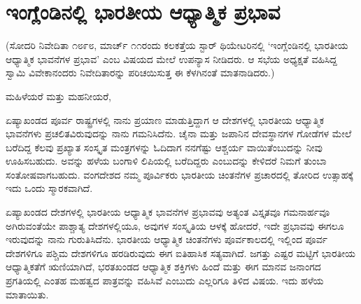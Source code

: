 
\chapter{ಇಂಗ್ಲೆಂಡಿನಲ್ಲಿ ಭಾರತೀಯ ಆಧ್ಯಾತ್ಮಿಕ ಪ್ರಭಾವ}

(ಸೋದರಿ ನಿವೇದಿತಾ ೧೮೯೮, ಮಾರ್ಚ್​ ೧೧ರಂದು ಕಲಕತ್ತೆಯ ಸ್ಟಾರ್​ ಥಿಯೇಟರಿನಲ್ಲಿ ‘ಇಂಗ್ಲೆಂಡಿನಲ್ಲಿ ಭಾರತೀಯ ಆಧ್ಯಾತ್ಮಿಕ ಭಾವನೆಗಳ ಪ್ರಭಾವ’ ಎಂಬ ವಿಷಯದ ಮೇಲೆ ಉಪನ್ಯಾಸ ನೀಡಿದರು. ಆ ಸಭೆಯ ಅಧ್ಯಕ್ಷತೆ ವಹಿಸಿದ್ದ ಸ್ವಾಮಿ ವಿವೇಕಾನಂದರು ನಿವೇದಿತಾರನ್ನು ಪರಿಚಯಿಸುತ್ತ ಈ ಕೆಳಗಿನಂತೆ ಮಾತನಾಡಿದರು.)

ಮಹಿಳೆಯರೆ ಮತ್ತು ಮಹನೀಯರೆ, 

ಏಷ್ಯಾಖಂಡದ ಪೂರ್ವ ರಾಷ್ಟ್ರಗಳಲ್ಲಿ ನಾನು ಪ್ರಯಾಣ ಮಾಡುತ್ತಿದ್ದಾಗ ಆ ದೇಶಗಳಲ್ಲಿ ಭಾರತೀಯ ಆಧ್ಯಾತ್ಮಿಕ ಭಾವನೆಗಳು ಪ್ರಚಲಿತವಿರುವುದನ್ನು ನಾನು ಗಮನಿಸಿದೆನು. ಚೈನಾ ಮತ್ತು ಜಪಾನಿನ ದೇವಸ್ಥಾನಗಳ ಗೋಡೆಗಳ ಮೇಲೆ ಬರೆದಿದ್ದ ಕೆಲವು ಪ್ರಖ್ಯಾತ ಸಂಸ್ಕೃತ ಮಂತ್ರಗಳನ್ನು ಓದಿದಾಗ ನನಗೆಷ್ಟು ಆಶ್ಚರ್ಯ ವಾಯಿತೆಂಬುದನ್ನು ನೀವು ಊಹಿಸಬಹುದು. ಅವನ್ನು ಹಳೆಯ ಬಂಗಾಳಿ ಲಿಪಿಯಲ್ಲಿ ಬರೆದಿದ್ದರು ಎಂಬುದನ್ನು ಕೇಳಿದರೆ ನಿಮಗೆ ತುಂಬಾ ಸಂತೋಷವಾಗಬಹುದು. ವಂಗದೇಶದ ನಮ್ಮ ಪೂರ್ವಿಕರು ಭಾರತೀಯ ಚಿಂತನೆಗಳ ಪ್ರಚಾರದಲ್ಲಿ ತೋರಿದ ಉತ್ಸಾಹಕ್ಕೆ ಇದು ಒಂದು ಸ್ಮಾರಕವಾಗಿದೆ. 

ಏಷ್ಯಾಖಂಡದ ದೇಶಗಳಲ್ಲಿ ಭಾರತೀಯ ಆಧ್ಯಾತ್ಮಿಕ ಭಾವನೆಗಳ ಪ್ರಭಾವವು ಅತ್ಯಂತ ವಿಸ್ತೃತವೂ ಗಮನಾರ್ಹವೂ ಅಗಿರುವಂತೆಯೇ ಪಾಶ್ಚಾತ್ಯ ದೇಶಗಳಲ್ಲಿಯೂ, ಅವುಗಳ ಸಂಸ್ಕೃತಿಯ ಆಳಕ್ಕೆ ಹೋದರೆ, ಇದೇ ಪ್ರಭಾವವು ಈಗಲೂ ಇರುವುದನ್ನು ನಾನು ಗುರುತಿಸಿದೆನು. ಭಾರತೀಯ ಆಧ್ಯಾತ್ಮಿಕ ಚಿಂತನೆಗಳು ಪೂರ್ವಕಾಲದಲ್ಲಿ ಇಲ್ಲಿಂದ ಪೂರ್ವ ದೇಶಗಳಿಗೂ ಪಶ್ಚಿಮ ದೇಶಗಳಿಗೂ ಹರಡಿರುವುದು ಈಗ ಐತಿಹಾಸಿಕ ಸತ್ಯವಾಗಿದೆ. ಜಗತ್ತು ಎಷ್ಟರ ಮಟ್ಟಿಗೆ ಭಾರತೀಯ ಆಧ್ಯಾತ್ಮಿಕತೆಗೆ ಋಣಿಯಾಗಿದೆ, ಭರತಖಂಡದ ಆಧ್ಯಾತ್ಮಿಕ ಶಕ್ತಿಗಳು ಹಿಂದೆ ಮತ್ತು ಈಗ ಮಾನವ ಜನಾಂಗದ ಪ್ರಗತಿಯಲ್ಲಿ ಎಂತಹ ಮಹತ್ವದ ಪಾತ್ರವನ್ನು ವಹಿಸಿವೆ ಎಂಬುದು ಎಲ್ಲರಿಗೂ ತಿಳಿದ ವಿಷಯ. ಇದು ಹಳೆಯ ಮಾತಾಯಿತು. 

